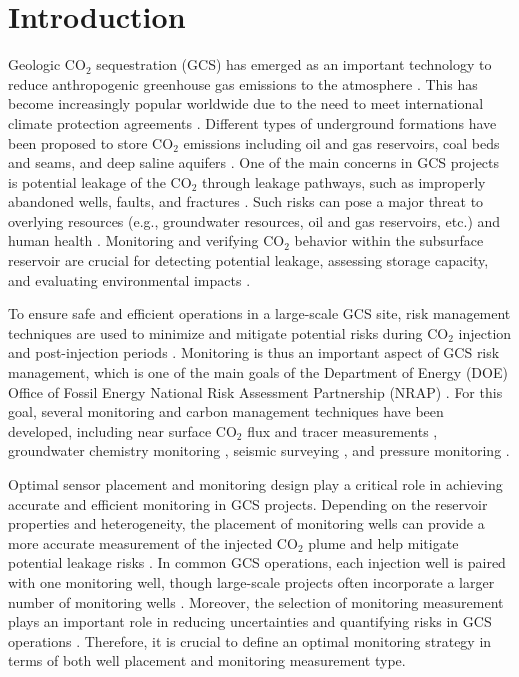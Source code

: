 \documentclass[a4paper,fleqn]{cas-sc}
\begin{document}
\section{Introduction}
Geologic CO$_2$ sequestration (GCS) has emerged as an important technology to reduce anthropogenic greenhouse gas emissions to the atmosphere \citep{Metz2005, krevorCCS2018}. This has become increasingly popular worldwide due to the need to meet international climate protection agreements \citep{Unitednations2015AgreementP}. Different types of underground formations have been proposed to store CO$_2$ emissions including oil and gas reservoirs, coal beds and seams, and deep saline aquifers \citep{Dai2016CO2Sites}. One of the main concerns in GCS projects is potential leakage of the CO$_2$ through leakage pathways, such as improperly abandoned wells, faults, and fractures \citep{Harp2016150, Nordbotten2012234}. Such risks can pose a major threat to overlying resources (e.g., groundwater resources, oil and gas reservoirs, etc.) and human health \citep{Benson2003}. Monitoring and verifying CO$_2$ behavior within the subsurface reservoir are crucial for detecting potential leakage, assessing storage capacity, and evaluating environmental impacts \citep{Condor20114036}.

To ensure safe and efficient operations in a large-scale GCS site, risk management techniques are used to minimize and mitigate potential risks during CO$_2$ injection and post-injection periods \citep{Nicot2013388, Chadwick20051385}. Monitoring is thus an important aspect of GCS risk management, which is one of the main goals of the Department of Energy (DOE) Office of Fossil Energy National Risk Assessment Partnership (NRAP) \citep{Pawar2016175}. For this goal, several monitoring and carbon management techniques have been developed, including near surface CO$_2$ flux and tracer measurements \citep{Yang2012185}, groundwater chemistry monitoring \citep{Dai2014}, seismic surveying \citep{Grana2017296}, and pressure monitoring \citep{Keating20144163, Wang2014188}. 

Optimal sensor placement and monitoring design play a critical role in achieving accurate and efficient monitoring in GCS projects. Depending on the reservoir properties and heterogeneity, the placement of monitoring wells can provide a more accurate measurement of the injected CO$_2$ plume and help mitigate potential leakage risks \citep{Sun2019, Ma2022}. In common GCS operations, each injection well is paired with one monitoring well, though large-scale projects often incorporate a larger number of monitoring wells \citep{ButlerJr.19993553}. Moreover, the selection of monitoring measurement plays an important role in reducing uncertainties and quantifying risks in GCS operations \citep{Chen2020, Sun2013}. Therefore, it is crucial to define an optimal monitoring strategy in terms of both well placement and monitoring measurement type. 
\end{document}
